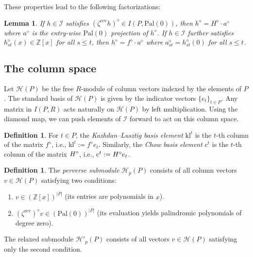 \documentclass{article}
\newcommand{\rev}{\mathrm{rev}}
\newcommand{\chow}{\normalfont{H}}
\newcommand{\Pal}[1]{\mathrm{Pal}(#1)}
\newcommand{\KLbasis}[1]{\mathrm{kl}^{#1}}
\newcommand{\Cbasis}[1]{\mathrm{c}^{#1}}
\newcommand{\hbasis}[1]{\mathcal{H}_{#1}(P)}
\newcommand{\cbasis}[1]{\mathcal{H}'_{#1}(P)}
\newtheorem{lemma}[theorem]{Lemma}
\theoremstyle{definition}
\newtheorem{definition}[theorem]{Definition}
\theoremstyle{remark}
\begin{document}
These properties lead to the following factorizations:

  \begin{lemma} \label{thm:kl_chow_factorization}
    If $h \in \mathcal{I}$ satisfies
    $(\zeta^\rev h)^\diamond \in I(P, \Pal{0})$,
    then $h^\diamond = H^\diamond \cdot a^\diamond$
    where $a^\diamond$ is the entry-wise $\Pal{0}$ projection of $h^\diamond$.
    If $h \in \mathcal{I}$ further satisfies
    $h^{\diamond}_{st}(x) \in \mathbb{Z}[x]$ for all $s \le t$,
    then $h^\diamond = f^\diamond \cdot a^\diamond$
    where $a^\diamond_{st} = h_{st}^\diamond(0)$ for all $s \le t$.
  \end{lemma}

  \subsection{The column space}

  Let \(\mathcal{H}(P)\) be the free \(R\)-module of column vectors
  indexed by the elements of \(P\).
  The standard basis of \(\mathcal{H}(P)\) is given by the
  indicator vectors \(\{e_t\}_{t \in P}\). Any matrix in
  \(I(P, R)\) acts naturally on \(\mathcal{H}(P)\) by left
  multiplication. Using the diamond map, we can push elements of
  \(\mathcal{I}\) forward to act on this column space.

  \begin{definition}
    For \(t \in P\), the \emph{Kazhdan--Lusztig basis element} \(\KLbasis{t}\) is the \(t\)-th column of the matrix \(f^\diamond\), i.e., \(\KLbasis{t} := f^\diamond e_t\). 
    Similarly, the \emph{Chow basis element} \(\Cbasis{t}\) is the \(t\)-th column of the matrix \(\chow^\diamond\), i.e., \(\Cbasis{t} := \chow^\diamond e_t\).
\end{definition}

\begin{definition}
    The \emph{perverse submodule} \(\hbasis{p}\) consists of all column vectors \(v \in \mathcal{H}(P)\) satisfying two conditions:
    \begin{enumerate}
        \item \(v \in (\mathbb{Z}[x])^{|P|}\) (its entries are polynomials in \(x\)).
        \item \((\zeta^\rev)^\diamond v \in (\Pal{0})^{|P|}\) (its evaluation yields palindromic polynomials of degree zero).
    \end{enumerate}
    The relaxed submodule \(\cbasis{p}\) consists of all vectors \(v \in \mathcal{H}(P)\) satisfying only the second condition.
\end{definition}
\end{document}
